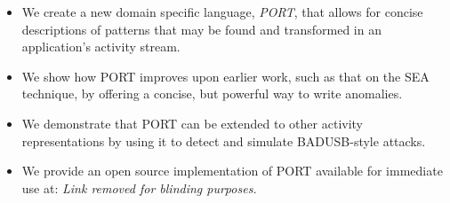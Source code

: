 \begin{itemize}

\item We create a new domain specific language, {\em PORT},
  that allows for concise descriptions of patterns
  that may be
  found and transformed in an application's activity stream.

\item We show how PORT improves upon earlier work, such as that on the SEA technique, by offering a concise, but powerful way to write anomalies.

\item We demonstrate that PORT can be extended to other activity representations by using it to detect and simulate BADUSB-style attacks.

\item We provide an open source implementation of PORT available for immediate use
at: \textit{Link removed for blinding purposes.}

\end{itemize}


